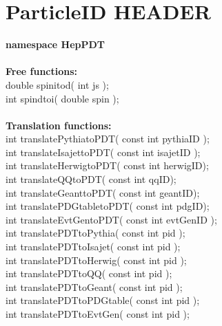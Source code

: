 \section { ParticleID HEADER}
\label{PIDclass}

\begin{tabbing}

{\bf namespace HepPDT} \\  \\

{\bf Free functions:} \\
\hspace{0.5in}  double spinitod( int js ); \\
\hspace{0.5in}  int spindtoi( double spin ); \\  \\

{\bf Translation functions:} \\
\hspace{0.5in} int translatePythiatoPDT( const int pythiaID ); \\
\hspace{0.5in} int translateIsajettoPDT( const int isajetID ); \\
\hspace{0.5in} int translateHerwigtoPDT( const int herwigID); \\
\hspace{0.5in} int translateQQtoPDT( const int qqID); \\
\hspace{0.5in} int translateGeanttoPDT( const int geantID); \\
\hspace{0.5in} int translatePDGtabletoPDT( const int pdgID); \\
\hspace{0.5in} int translateEvtGentoPDT( const int evtGenID ); \\

\hspace{0.5in} int translatePDTtoPythia( const int pid ); \\
\hspace{0.5in} int translatePDTtoIsajet( const int pid ); \\
\hspace{0.5in} int translatePDTtoHerwig( const int pid ); \\
\hspace{0.5in} int translatePDTtoQQ( const int pid ); \\
\hspace{0.5in} int translatePDTtoGeant( const int pid ); \\
\hspace{0.5in} int translatePDTtoPDGtable( const int pid ); \\
\hspace{0.5in} int translatePDTtoEvtGen( const int pid ); \\  \\


\end{tabbing}

